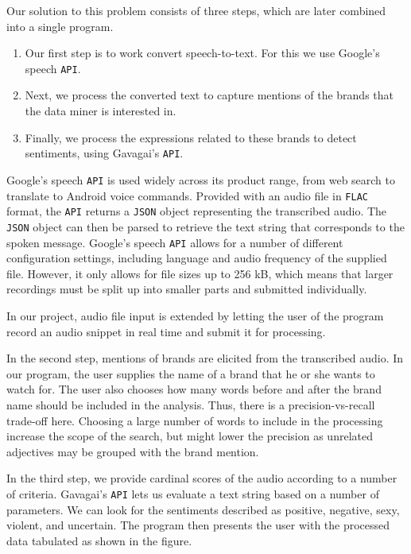 \documentclass[a4paper,12pt,twoside]{ltxdoc}
\begin{document}
Our solution to this problem consists of three steps, which are later combined into a single program.

\begin{enumerate}
\item Our first step is to work convert speech-to-text. For this we use Google's speech \verb#API#.

\item Next, we process the converted text to capture mentions of the brands that the data miner is interested in.

\item Finally, we process the expressions related to these brands to detect sentiments, using Gavagai's \verb#API#.
\end{enumerate}

Google's speech \verb#API# is used widely across its product range, from web search to translate to Android voice commands.
Provided with an audio file in \verb#FLAC# format, the \verb#API# returns a \verb#JSON# object representing the transcribed audio. The \verb#JSON# object
can then be parsed to retrieve the text string that corresponds to the spoken message. Google's speech \verb#API# allows for a number
of different configuration settings, including language and audio frequency of the supplied file. However, it only allows for file sizes up to 256 kB, 
which means that larger recordings must be split up into smaller parts and submitted individually.

In our project, audio file input is extended by letting the user of the program record an audio snippet in real time and
submit it for processing.

In the second step, mentions of brands are elicited from the transcribed audio. In our program, the user supplies the name
of a brand that he or she wants to watch for. The user also chooses how many words before and after the brand name should
be included in the analysis. Thus, there is a precision-vs-recall trade-off here. Choosing a large number of words to include
in the processing increase the scope of the search, but might lower the precision as unrelated adjectives may be grouped
with the brand mention.

In the third step, we provide cardinal scores of the audio according to a number of criteria. Gavagai's \verb#API# lets us
evaluate a text string based on a number of parameters. We can look for the sentiments described as positive, negative, sexy, violent,
and uncertain. The program then presents the user with the processed data tabulated as shown in the figure. %
\end{document}
